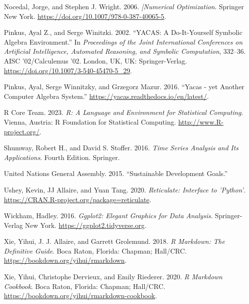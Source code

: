 \begin{CSLReferences}{1}{0}
\leavevmode{}%
Nocedal, Jorge, and Stephen J. Wright. 2006. \emph{{[}Numerical Optimization}. Springer New York. \url{https://doi.org/10.1007/978-0-387-40065-5}.

\leavevmode{}%
Pinkus, Ayal Z., and Serge Winitzki. 2002. {``{YACAS: A Do-It-Yourself Symbolic Algebra Environment}.''} In \emph{Proceedings of the Joint International Conferences on Artificial Intelligence, Automated Reasoning, and Symbolic Computation}, 332--36. AISC '02/Calculemus '02. London, UK, UK: Springer-Verlag. \url{https://doi.org/10.1007/3-540-45470-5_29}.

\leavevmode{}%
Pinkus, Ayal, Serge Winnitzky, and Grzegorz Mazur. 2016. {``Yacas - yet Another Computer Algebra System.''} \url{https://yacas.readthedocs.io/en/latest/}.

\leavevmode{}%
R Core Team. 2023. \emph{R: A Language and Environment for Statistical Computing}. Vienna, Austria: R Foundation for Statistical Computing. \url{http://www.R-project.org/}.

\leavevmode{}%
Shumway, Robert H., and David S. Stoﬀer. 2016. \emph{Time Series Analysis and Its Applications}. Fourth Edition. Springer.

\leavevmode{}%
United Nations General Assembly. 2015. {``Sustainable Development Goals.''}

\leavevmode{}%
Ushey, Kevin, JJ Allaire, and Yuan Tang. 2020. \emph{Reticulate: Interface to 'Python'}. \url{https://CRAN.R-project.org/package=reticulate}.

\leavevmode{}%
Wickham, Hadley. 2016. \emph{Ggplot2: Elegant Graphics for Data Analysis}. Springer-Verlag New York. \url{https://ggplot2.tidyverse.org}.

\leavevmode{}%
Xie, Yihui, J. J. Allaire, and Garrett Grolemund. 2018. \emph{R Markdown: The Definitive Guide}. Boca Raton, Florida: Chapman; Hall/CRC. \url{https://bookdown.org/yihui/rmarkdown}.

\leavevmode{}%
Xie, Yihui, Christophe Dervieux, and Emily Riederer. 2020. \emph{R Markdown Cookbook}. Boca Raton, Florida: Chapman; Hall/CRC. \url{https://bookdown.org/yihui/rmarkdown-cookbook}.

\end{CSLReferences}

